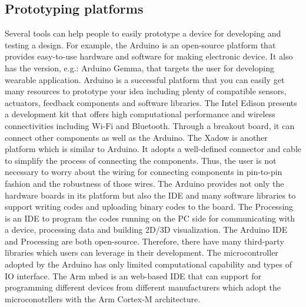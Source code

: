 \subsection{Prototyping platforms}
Several tools can help people to easily prototype a device for developing and testing a design. For example, the Arduino \cite{Arduino} is an open-source platform that provides easy-to-use hardware and software for making electronic device. It also has the version, e.g.: Arduino Gemma, that targets the user for developing wearable application. Arduino is a successful platform that you can easily get many resources to prototype your idea including plenty of compatible sensors, actuators, feedback components and software libraries.
The Intel Edison \cite{IntelEdison} presents a development kit that offers high computational performance and wireless connectivities including Wi-Fi and Bluetooth. Through a breakout board, it can connect other components as well as the Arduino.
The Xadow \cite{xadow} is another platform which is similar to Arduino. It adopts a well-defined connector and cable to simplify the process of connecting the components. Thus, the user is not necessary to worry about the wiring for connecting components in pin-to-pin fashion and the robustness of those wires.
The Arduino provides not only the hardware boards in its platform but also the IDE and many software libraries to support writing codes and uploading binary codes to the board. 
The Processing \cite{Processing} is an IDE to program the codes running on the PC side for communicating with a device, processing data and building 2D/3D visualization. The Arduino IDE and Processing are both open-source. Therefore, there have many third-party libraries which users can leverage in their development.
The microcontroller adopted by the Arduino has only limited computational capability and types of IO interface. 
The Arm mbed \cite{mbed} is an web-based IDE that can support for programming different devices from different manufacturers which adopt the microconotrllers with the Arm Cortex-M architecture.

